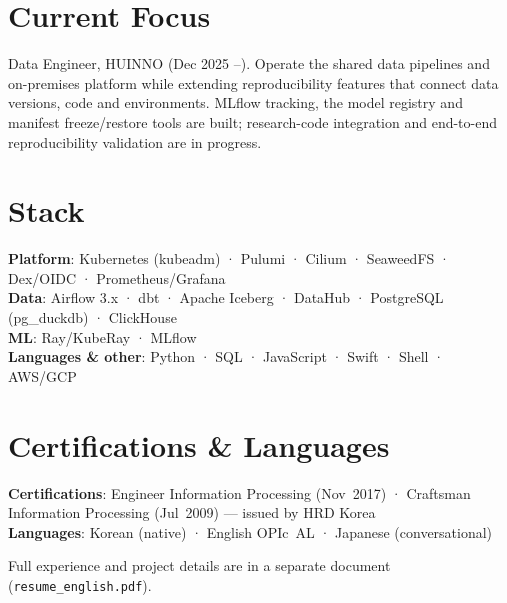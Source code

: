 \section{Current Focus}
\begin{itemize}[leftmargin=0.15in, label={}]
\small{\item{Data Engineer, HUINNO (Dec 2025 --). Operate the shared data pipelines and on-premises platform while extending reproducibility features that connect data versions, code and environments. MLflow tracking, the model registry and manifest freeze/restore tools are built; research-code integration and end-to-end reproducibility validation are in progress.}}
\end{itemize}
\section{Stack}
\begin{itemize}[leftmargin=0.15in, label={}]
    \small{\item{
    \textbf{Platform}: Kubernetes (kubeadm) · Pulumi · Cilium · SeaweedFS · Dex/OIDC · Prometheus/Grafana \\[2pt]
    \textbf{Data}: Airflow 3.x · dbt · Apache Iceberg · DataHub · PostgreSQL (pg\_duckdb) · ClickHouse \\[2pt]
    \textbf{ML}: Ray/KubeRay · MLflow \\[2pt]
    \textbf{Languages \& other}: Python · SQL · JavaScript · Swift · Shell · AWS/GCP
    }}
\end{itemize}

\section{Certifications \& Languages}
\begin{itemize}[leftmargin=0.15in, label={}]
    \small{\item{
    \textbf{Certifications}: Engineer Information Processing \mbox{(Nov 2017)} · Craftsman Information Processing \mbox{(Jul 2009)} — issued by HRD Korea \\[2pt]
    \textbf{Languages}: Korean (native) · English \mbox{OPIc AL} · Japanese (conversational)
    }}
\end{itemize}

\vspace{1pt}
{\small Full experience and project details are in a separate document (\texttt{resume\_english.pdf}).}

